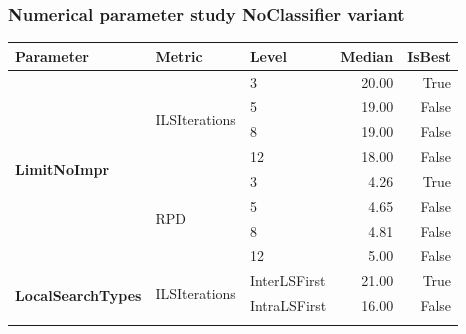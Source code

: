 \subsubsection{Numerical parameter study NoClassifier variant}
\begin{table}[!ht]
	\scriptsize
	\centering
	\renewcommand{\multirowsetup}{\centering}
	\begin{tabular}{l l l r r}
		\toprule
		\textbf{Parameter}                             & \textbf{Metric}                   & \textbf{Level}        & \textbf{Median} & \textbf{IsBest} \\
		\midrule
		\multirow[t]{8}{*}{\textbf{LimitNoImpr}}       & \multirow[t]{4}{*}{ILSIterations} & 3                     & 20.00           & True            \\\cmidrule(lr){3-5}
		                                               &                                   & 5                     & 19.00           & False           \\\cmidrule(lr){3-5}
		                                               &                                   & 8                     & 19.00           & False           \\\cmidrule(lr){3-5}
		                                               &                                   & 12                    & 18.00           & False           \\\cmidrule(lr){2-5}
		                                               & \multirow[t]{4}{*}{RPD}           & 3                     & 4.26            & True            \\\cmidrule(lr){3-5}
		                                               &                                   & 5                     & 4.65            & False           \\\cmidrule(lr){3-5}
		                                               &                                   & 8                     & 4.81            & False           \\\cmidrule(lr){3-5}
		                                               &                                   & 12                    & 5.00            & False           \\\midrule
		\multirow[t]{4}{*}{\textbf{LocalSearchTypes}}  & \multirow[t]{2}{*}{ILSIterations} & InterLSFirst          & 21.00           & True            \\\cmidrule(lr){3-5}
		                                               &                                   & IntraLSFirst          & 16.00           & False           \\\cmidrule(lr){2-5}

\end{tabular}
\end{table}
